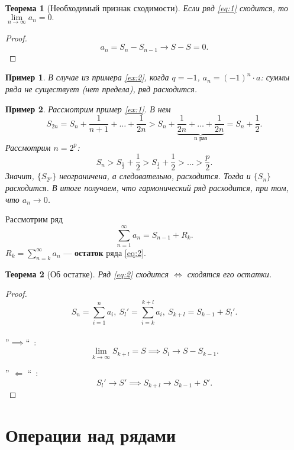 \documentclass[12pt]{report}
\newtheorem{theorem}{Теорема}
\newtheorem{example}{Пример}
\begin{document}
\begin{theorem}[Необходимый признак сходимости]
Если ряд \eqref{eq:1} сходится, то $\lim\limits_{n \to \infty} a_n = 0.$
\end{theorem}
\begin{proof}
\[ a_n = S_n - S_{n-1} \to S - S = 0.\]
\end{proof}

\begin{example} \label{ex:3}
В случае из примера \ref{ex:2}, когда $q = -1$, $a_n = (-1)^n \cdot a$: суммы ряда не существует (нет предела), ряд расходится.
\end{example}

\begin{example} \label{ex:4}
Рассмотрим пример \ref{ex:1}. В нем
\[ S_{2n} = S_n + \frac{1}{n + 1} + \dots + \frac{1}{2n} > S_n + \underbrace{\frac{1}{2n} + \dots + \frac{1}{2n}}_{\text{n раз}} = S_n + \frac{1}{2}.\]
Рассмотрим $n = 2^p$:
\[S_n > S_{\frac{1}{2}} + \frac{1}{2} > S_{\frac{1}{4}} + \frac{1}{2} > \dots > \frac{p}{2}.\]
Значит, $\{ S_{2^ p}\}$ неограничена, а следовательно, расходится. Тогда и $\{ S_n \}$ расходится. В итоге получаем, что гармонический ряд расходится, при том, что $a_n \to 0$.\\
\end{example}

Рассмотрим ряд
\begin{equation} \label{eq:2}
\sum_{n = 1}^{\infty} a_n = S_{n-1} + R_k.
\end{equation}
$R_k = \sum\limits_{n = k}^{\infty} a_n$ --- \textbf{остаток} ряда \eqref{eq:2}.

\begin{theorem}[Об остатке]
Ряд \eqref{eq:2} сходится $\iff$ сходятся его остатки.
\end{theorem}
\begin{proof}
\[S_n = \sum\limits_{i = 1}^{n}a_i,~S_l' = \sum\limits_{i = k}^{k + l} a_i,~S_{k+l} = S_{k-1} + S_l'.\]\\

''$\implies$``~:
\[ \lim_{k \to \infty}S_{k+l} = S \implies  S_l \to S - S_{k-1}.\]

'' $\Longleftarrow$ ``~:
\[ S_l' \to S' \implies S_{k+l} \to S_{k-1} + S'.\]
\end{proof}

\section{Операции над рядами}
\end{document}
